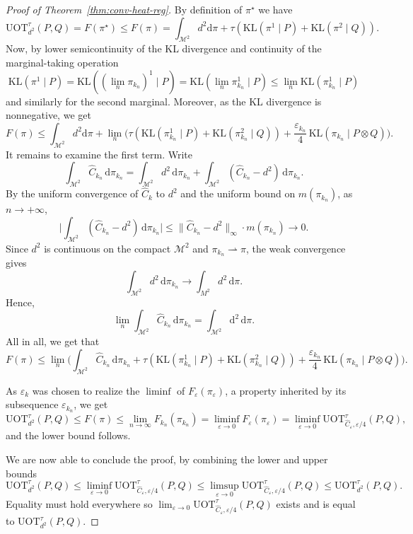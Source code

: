 \documentclass{article}
\theoremstyle{plain}
\theoremstyle{definition}
\theoremstyle{remark}
\newcommand{\M}{\ensuremath{\mathcal{M}}}
\begin{document}
\begin{proof}[Proof of Theorem~\ref{thm:conv-heat-reg}]
By definition of $\pi^{\star}$ we have
\[
\mathrm{UOT}^\tau_{d^2}(P,Q) = F(\pi^{\star}) \le F(\pi) = \int_{\M^2} d^2 \mathrm{d}\pi + \tau \left(\mathrm{KL}(\pi^1 \mid P)
+ \mathrm{KL}(\pi^2 \mid Q)\right).
\]
Now, by lower semicontinuity of the KL divergence and continuity of the marginal-taking operation
\[
\mathrm{KL}(\pi^1 \mid P) = \mathrm{KL}((\lim_{n} \pi_{k_{n}})^{1} \mid P) = \mathrm{KL}(\lim_{n} \pi_{k_{n}}^{1} \mid P) \le \lim_{n} \mathrm{KL}(\pi_{k_{n}}^1 \mid P)
\]
and similarly for the second marginal. Moreover, as the KL divergence is nonnegative, we get
\[
F(\pi) \le \int_{\M^2} d^2 \mathrm{d}\pi + \lim_{n} \Bigg( \tau \left(\mathrm{KL}(\pi_{k_{n}}^1 \mid P)
+ \mathrm{KL}(\pi_{k_{n}}^2 \mid Q)\right) + \frac{\varepsilon_{k_n}}{4} \,\mathrm{KL}(\pi_{k_{n}} \mid P \otimes Q) \Bigg).
\]
It remains to examine the first term. Write
\[
\int_{\M^2}  \widehat{C}_{k_n}\, \mathrm{d}\pi_{k_n}
= \int_{\M^2} d^2\, \mathrm{d}\pi_{k_n} + \int_{\M^2} ( \widehat{C}_{k_n} - d^2)\, \mathrm{d}\pi_{k_n}.
\]
By the uniform convergence of $\widehat{C}_k$ to $d^2$ and the uniform bound on $m(\pi_{k_n})$, as $n \to +\infty$,
\[
\biggl|\int_{\M^2}(\widehat{C}_{k_n} - d^2)\, \mathrm{d}\pi_{k_n}\biggr|
\le \|\widehat{C}_{k_n} - d^2\|_\infty \cdot m(\pi_{k_n}) \longrightarrow 0.
\]
Since $d^2$ is continuous on the compact $\M^2$ and $\pi_{k_n} \rightharpoonup \pi$, the weak convergence gives
\[
\int_{\M^2} d^2\, \mathrm{d}\pi_{k_n} \longrightarrow \int_{M^2} d^2\, \mathrm{d}\pi.
\]
Hence,
\[
\lim_{n} \int_{\M^2} \widehat{C}_{k_n}\, \mathrm{d}\pi_{k_n} = \int_{\M^2} \mathrm{d}^2\, \mathrm{d}\pi.
\]
All in all, we get that
\[
F(\pi) \le \lim_{n} \Bigg (\int_{\M^2} \widehat{C}_{k_n}\, \mathrm{d}\pi_{k_n} + \tau \left(\mathrm{KL}(\pi_{k_{n}}^1 \mid P)
+ \mathrm{KL}(\pi_{k_{n}}^2 \mid Q)\right) + \frac{\varepsilon_{k_n}}{4} \,\mathrm{KL}(\pi_{k_{n}} \mid P \otimes Q) \Bigg).
\]

As $\varepsilon_{k}$ was chosen to realize the $\liminf$ of $F_{\varepsilon}(\pi_{\varepsilon})$, a property inherited by its subsequence $\varepsilon_{k_{n}}$, we get
\[
\mathrm{UOT}^\tau_{d^2}(P,Q) \le F(\pi) \le \lim_{n \to \infty} F_{k_{n}}(\pi_{k_n}) = \liminf_{\varepsilon \to 0} F_{\varepsilon}(\pi_{\varepsilon}) = \liminf_{\varepsilon\to0}
\mathrm{UOT}^\tau_{\widehat C_{\varepsilon},\varepsilon/4}(P,Q),
\]
and the lower bound follows.

We are now able to conclude the proof, by combining the lower and upper bounds
\[
\mathrm{UOT}^\tau_{d^2}(P,Q)
\le \liminf_{\varepsilon\to0}
\mathrm{UOT}^\tau_{\widehat C_{\varepsilon},\varepsilon/4}(P,Q) \le \limsup_{\varepsilon\to0}
\mathrm{UOT}^\tau_{\widehat C_{\varepsilon},\varepsilon/4}(P,Q) \le 
\mathrm{UOT}^\tau_{d^2}(P,Q).
\]
Equality must hold everywhere so $\lim_{\varepsilon\to0}
\mathrm{UOT}^{\tau}_{\widehat C_{\varepsilon},\varepsilon/4}(P,Q)$ exists and is equal to $
\mathrm{UOT}^{\tau}_{d^2}(P,Q)$.	



\end{proof}
\end{document}
